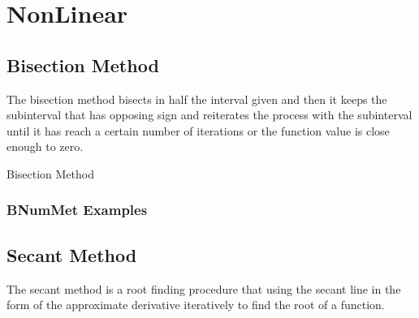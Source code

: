 \section*{NonLinear}
\subsection*{Bisection Method}
The bisection method bisects in half the interval given and then it keeps the subinterval that has opposing sign and reiterates the process with the subinterval until it has reach a certain number of iterations or the function value is close enough to zero. 

\begin{algorithm}[H]
\label{alg:Bisection Method}
\SetAlgoLined
  \caption{Bisection Method}
  
\end{algorithm}
\subsubsection*{BNumMet Examples}




\subsection*{Secant Method}
The secant method is a root finding procedure that using the secant line in the form of the approximate derivative iteratively to find the root of a function. 

